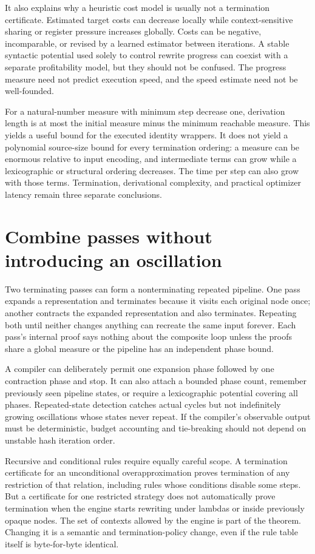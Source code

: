 It also explains why a heuristic cost model is usually not a termination certificate.
Estimated target costs can decrease locally while context-sensitive sharing or register pressure increases globally.
Costs can be negative, incomparable, or revised by a learned estimator between iterations.
A stable syntactic potential used solely to control rewrite progress can coexist with a separate profitability model, but they should not be confused.
The progress measure need not predict execution speed, and the speed estimate need not be well-founded.

For a natural-number measure with minimum step decrease one, derivation length is at most the initial measure minus the minimum reachable measure.
This yields a useful bound for the executed identity wrappers.
It does not yield a polynomial source-size bound for every termination ordering: a measure can be enormous relative to input encoding, and intermediate terms can grow while a lexicographic or structural ordering decreases.
The time per step can also grow with those terms.
Termination, derivational complexity, and practical optimizer latency remain three separate conclusions.

\section{Combine passes without introducing an oscillation}
\label{sec:ch83-composition}
Two terminating passes can form a nonterminating repeated pipeline.
One pass expands a representation and terminates because it visits each original node once; another contracts the expanded representation and also terminates.
Repeating both until neither changes anything can recreate the same input forever.
Each pass's internal proof says nothing about the composite loop unless the proofs share a global measure or the pipeline has an independent phase bound.

A compiler can deliberately permit one expansion phase followed by one contraction phase and stop.
It can also attach a bounded phase count, remember previously seen pipeline states, or require a lexicographic potential covering all phases.
Repeated-state detection catches actual cycles but not indefinitely growing oscillations whose states never repeat.
If the compiler's observable output must be deterministic, budget accounting and tie-breaking should not depend on unstable hash iteration order.

Recursive and conditional rules require equally careful scope.
A termination certificate for an unconditional overapproximation proves termination of any restriction of that relation, including rules whose conditions disable some steps.
But a certificate for one restricted strategy does not automatically prove termination when the engine starts rewriting under lambdas or inside previously opaque nodes.
The set of contexts allowed by the engine is part of the theorem.
Changing it is a semantic and termination-policy change, even if the rule table itself is byte-for-byte identical.

